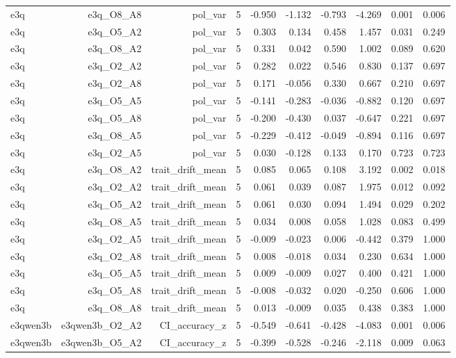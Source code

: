 \documentclass[11pt]{article}
\begin{document}
\begin{landscape}
\begin{longtable}{@{}lrrrrrrrrr@{}}
e3q & e3q\_O8\_A8 & pol\_var & 5 & -0.950 & -1.132 & -0.793 & -4.269 & 0.001 & 0.006 \\
e3q & e3q\_O5\_A2 & pol\_var & 5 & 0.303 & 0.134 & 0.458 & 1.457 & 0.031 & 0.249 \\
e3q & e3q\_O8\_A2 & pol\_var & 5 & 0.331 & 0.042 & 0.590 & 1.002 & 0.089 & 0.620 \\
e3q & e3q\_O2\_A2 & pol\_var & 5 & 0.282 & 0.022 & 0.546 & 0.830 & 0.137 & 0.697 \\
e3q & e3q\_O2\_A8 & pol\_var & 5 & 0.171 & -0.056 & 0.330 & 0.667 & 0.210 & 0.697 \\
e3q & e3q\_O5\_A5 & pol\_var & 5 & -0.141 & -0.283 & -0.036 & -0.882 & 0.120 & 0.697 \\
e3q & e3q\_O5\_A8 & pol\_var & 5 & -0.200 & -0.430 & 0.037 & -0.647 & 0.221 & 0.697 \\
e3q & e3q\_O8\_A5 & pol\_var & 5 & -0.229 & -0.412 & -0.049 & -0.894 & 0.116 & 0.697 \\
e3q & e3q\_O2\_A5 & pol\_var & 5 & 0.030 & -0.128 & 0.133 & 0.170 & 0.723 & 0.723 \\
e3q & e3q\_O8\_A2 & trait\_drift\_mean & 5 & 0.085 & 0.065 & 0.108 & 3.192 & 0.002 & 0.018 \\
e3q & e3q\_O2\_A2 & trait\_drift\_mean & 5 & 0.061 & 0.039 & 0.087 & 1.975 & 0.012 & 0.092 \\
e3q & e3q\_O5\_A2 & trait\_drift\_mean & 5 & 0.061 & 0.030 & 0.094 & 1.494 & 0.029 & 0.202 \\
e3q & e3q\_O8\_A5 & trait\_drift\_mean & 5 & 0.034 & 0.008 & 0.058 & 1.028 & 0.083 & 0.499 \\
e3q & e3q\_O2\_A5 & trait\_drift\_mean & 5 & -0.009 & -0.023 & 0.006 & -0.442 & 0.379 & 1.000 \\
e3q & e3q\_O2\_A8 & trait\_drift\_mean & 5 & 0.008 & -0.018 & 0.034 & 0.230 & 0.634 & 1.000 \\
e3q & e3q\_O5\_A5 & trait\_drift\_mean & 5 & 0.009 & -0.009 & 0.027 & 0.400 & 0.421 & 1.000 \\
e3q & e3q\_O5\_A8 & trait\_drift\_mean & 5 & -0.008 & -0.032 & 0.020 & -0.250 & 0.606 & 1.000 \\
e3q & e3q\_O8\_A8 & trait\_drift\_mean & 5 & 0.013 & -0.009 & 0.035 & 0.438 & 0.383 & 1.000 \\
e3qwen3b & e3qwen3b\_O2\_A2 & CI\_accuracy\_z & 5 & -0.549 & -0.641 & -0.428 & -4.083 & 0.001 & 0.006 \\
e3qwen3b & e3qwen3b\_O5\_A2 & CI\_accuracy\_z & 5 & -0.399 & -0.528 & -0.246 & -2.118 & 0.009 & 0.063 \\

\end{longtable}
\end{landscape}
\end{document}
